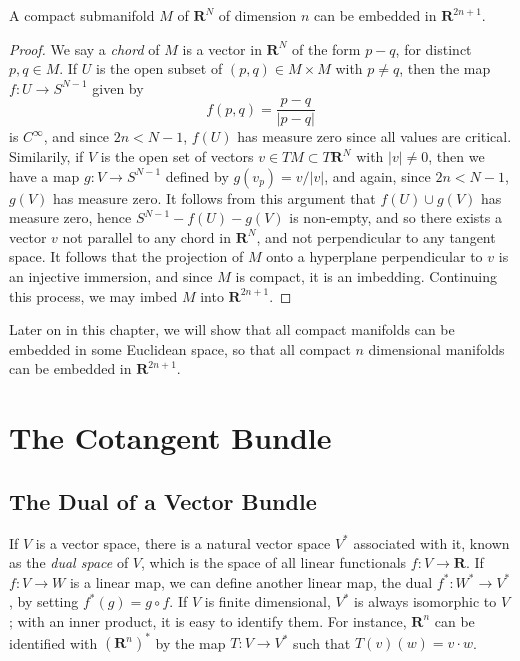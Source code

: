 \begin{theorem}
    A compact submanifold $M$ of $\mathbf{R}^N$ of dimension $n$ can be embedded in $\mathbf{R}^{2n+1}$.
\end{theorem}
\begin{proof}
    We say a {\it chord} of $M$ is a vector in $\mathbf{R}^N$ of the form $p - q$, for distinct $p,q \in M$. If $U$ is the open subset of $(p,q) \in M \times M$ with $p \neq q$, then the map $f: U \to S^{N-1}$ given by
    \[ f(p,q) = \frac{p-q}{|p-q|} \]
    is $C^\infty$, and since $2n < N-1$, $f(U)$ has measure zero since all values are critical. Similarily, if $V$ is the open set of vectors $v \in TM \subset T\mathbf{R}^N$ with $|v| \neq 0$, then we have a map $g: V \to S^{N-1}$ defined by $g(v_p) = v/|v|$, and again, since $2n < N-1$, $g(V)$ has measure zero. It follows from this argument that $f(U) \cup g(V)$ has measure zero, hence $S^{N-1} - f(U) - g(V)$ is non-empty, and so there exists a vector $v$ not parallel to any chord in $\mathbf{R}^N$, and not perpendicular to any tangent space. It follows that the projection of $M$ onto a hyperplane perpendicular to $v$ is an injective immersion, and since $M$ is compact, it is an imbedding. Continuing this process, we may imbed $M$ into $\mathbf{R}^{2n+1}$.
\end{proof}

Later on in this chapter, we will show that all compact manifolds can be embedded in some Euclidean space, so that all compact $n$ dimensional manifolds can be embedded in $\mathbf{R}^{2n+1}$.

\chapter{The Cotangent Bundle}

\section{The Dual of a Vector Bundle}

If $V$ is a vector space, there is a natural vector space $V^*$ associated with it, known as the {\it dual space} of $V$, which is the space of all linear functionals $f: V \to \mathbf{R}$. If $f: V \to W$ is a linear map, we can define another linear map, the dual $f^*: W^* \to V^*$, by setting $f^*(g) = g \circ f$. If $V$ is finite dimensional, $V^*$ is always isomorphic to $V$; with an inner product, it is easy to identify them. For instance, $\mathbf{R}^n$ can be identified with $(\mathbf{R}^n)^*$ by the map $T: V \to V^*$ such that $T(v)(w) = v \cdot w$.

